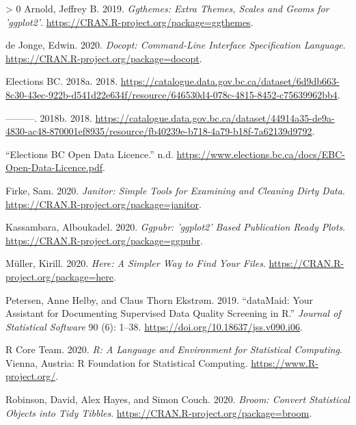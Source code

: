 \documentclass[
]{article}
\newlength{\cslhangindent}
\newenvironment{CSLReferences}[3] %
 {%
  \setlength{\parindent}{0pt}
  \ifodd #1 \everypar{\setlength{\hangindent}{\cslhangindent}}\ignorespaces\fi
  \ifnum #2 > 0
  \setlength{\parskip}{#3\baselineskip}
  \fi
 }%
 {}
\begin{document}
\hypertarget{refs}{}
\begin{CSLReferences}{1}{0}
\leavevmode\hypertarget{ref-ggthemes}{}%
Arnold, Jeffrey B. 2019. \emph{Ggthemes: Extra Themes, Scales and Geoms
for 'ggplot2'}. \url{https://CRAN.R-project.org/package=ggthemes}.

\leavevmode\hypertarget{ref-docopt}{}%
de Jonge, Edwin. 2020. \emph{Docopt: Command-Line Interface
Specification Language}.
\url{https://CRAN.R-project.org/package=docopt}.

\leavevmode\hypertarget{ref-pvp}{}%
Elections BC. 2018a. 2018.
\url{https://catalogue.data.gov.bc.ca/dataset/6d9db663-8c30-43ec-922b-d541d22e634f/resource/646530d4-078c-4815-8452-c75639962bb4}.

\leavevmode\hypertarget{ref-pvr}{}%
---------. 2018b. 2018.
\url{https://catalogue.data.gov.bc.ca/dataset/44914a35-de9a-4830-ac48-870001ef8935/resource/fb40239e-b718-4a79-b18f-7a62139d9792}.

\leavevmode\hypertarget{ref-BC_elections_license}{}%
{``Elections BC Open Data Licence.''} n.d.
\url{https://www.elections.bc.ca/docs/EBC-Open-Data-Licence.pdf}.

\leavevmode\hypertarget{ref-janitor}{}%
Firke, Sam. 2020. \emph{Janitor: Simple Tools for Examining and Cleaning
Dirty Data}. \url{https://CRAN.R-project.org/package=janitor}.

\leavevmode\hypertarget{ref-ggpubr}{}%
Kassambara, Alboukadel. 2020. \emph{Ggpubr: 'ggplot2' Based Publication
Ready Plots}. \url{https://CRAN.R-project.org/package=ggpubr}.

\leavevmode\hypertarget{ref-here}{}%
Müller, Kirill. 2020. \emph{Here: A Simpler Way to Find Your Files}.
\url{https://CRAN.R-project.org/package=here}.

\leavevmode\hypertarget{ref-dataMaid}{}%
Petersen, Anne Helby, and Claus Thorn Ekstrøm. 2019. {``{dataMaid}: Your
Assistant for Documenting Supervised Data Quality Screening in {R}.''}
\emph{Journal of Statistical Software} 90 (6): 1--38.
\url{https://doi.org/10.18637/jss.v090.i06}.

\leavevmode\hypertarget{ref-R}{}%
R Core Team. 2020. \emph{R: A Language and Environment for Statistical
Computing}. Vienna, Austria: R Foundation for Statistical Computing.
\url{https://www.R-project.org/}.

\leavevmode\hypertarget{ref-broom}{}%
Robinson, David, Alex Hayes, and Simon Couch. 2020. \emph{Broom: Convert
Statistical Objects into Tidy Tibbles}.
\url{https://CRAN.R-project.org/package=broom}.


\end{CSLReferences}
\end{document}
